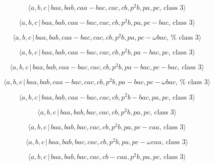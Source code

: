 \documentclass[10pt]{article}
\begin{document}
\begin{equation}
\langle a,b,c\,|\,baa,bab,caa-bac,cac,cb,p^2b,pa,pc,\,\text{class }3\rangle 
\tag{7.2748}
\end{equation}

\begin{equation}
\langle a,b,c\,|\,baa,bab,caa-bac,cac,cb,p^2b,pa,pc-bac,\,\text{class }%
3\rangle  \tag{7.2749}
\end{equation}

\begin{equation}
\langle a,b,c\,|\,baa,bab,caa-bac,cac,cb,p^{2}b,pa,pc-\omega bac,\,\text{%
class }3\rangle  \tag{7.2750}
\end{equation}

\begin{equation}
\langle a,b,c\,|\,baa,bab,caa-bac,cac,cb,p^2b,pa-bac,pc,\,\text{class }%
3\rangle  \tag{7.2751}
\end{equation}

\begin{equation}
\langle a,b,c\,|\,baa,bab,caa-bac,cac,cb,p^2b,pa-bac,pc-bac,\,\text{class }%
3\rangle  \tag{7.2752}
\end{equation}

\begin{equation}
\langle a,b,c\,|\,baa,bab,caa-bac,cac,cb,p^{2}b,pa-bac,pc-\omega bac,\,\text{%
class }3\rangle  \tag{7.2753}
\end{equation}

\begin{equation}
\langle a,b,c\,|\,baa,bab,caa-bac,cac,cb,p^2b-bac,pa,pc,\,\text{class }%
3\rangle  \tag{7.2754}
\end{equation}

\begin{equation}
\langle a,b,c\,|\,baa,bab,bac,cac,cb,p^2b,pa,pc,\,\text{class }3\rangle 
\tag{7.2755}
\end{equation}

\begin{equation}
\langle a,b,c\,|\,baa,bab,bac,cac,cb,p^2b,pa,pc-caa,\,\text{class }3\rangle 
\tag{7.2756}
\end{equation}

\begin{equation}
\langle a,b,c\,|\,baa,bab,bac,cac,cb,p^{2}b,pa,pc-\omega caa,\,\text{class }%
3\rangle  \tag{7.2757}
\end{equation}

\begin{equation}
\langle a,b,c\,|\,baa,bab,bac,cac,cb-caa,p^2b,pa,pc,\,\text{class }3\rangle 
\tag{7.2758}
\end{equation}
\end{document}
